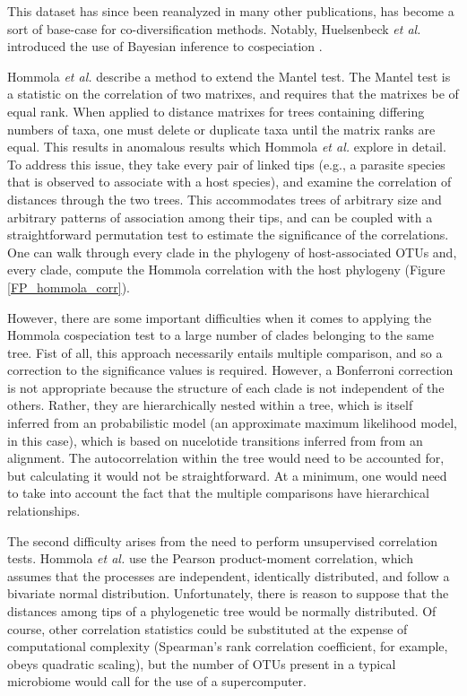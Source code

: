 This dataset has since been reanalyzed in many other publications, has become a sort of base-case for co-diversification methods. Notably, Huelsenbeck {\em et al.} introduced the use of Bayesian inference to cospeciation \cite{huelsenbeck2000bayesian}.

Hommola {\em et al.} \cite{hommola2009permutation} describe a method to extend the Mantel test. \cite{mantel1967detection} The Mantel test is a statistic on the correlation of two matrixes, and requires that the matrixes be of equal rank. When applied to distance matrixes for trees containing differing numbers of taxa, one must delete or duplicate taxa until the matrix ranks are equal. This results in anomalous results which Hommola {\em et al.} explore in detail. To address this issue, they take every pair of linked tips (e.g., a parasite species that is observed to associate with a host species), and examine the correlation of distances through the two trees. This accommodates trees of arbitrary size and arbitrary patterns of association among their tips, and can be coupled with a straightforward permutation test to estimate the significance of the correlations. One can walk through every clade in the phylogeny of host-associated OTUs and, every clade, compute the Hommola correlation with the host phylogeny (Figure \ref{FP_hommola_corr}). 



However, there are some important difficulties when it comes to applying the Hommola cospeciation test to a large number of clades belonging to the same tree. Fist of all, this approach necessarily entails multiple comparison, and so a correction to the significance values is required. However, a Bonferroni correction is not appropriate because the structure of each clade is not independent of the others. Rather, they are hierarchically nested within a tree, which is itself inferred from an probabilistic model (an approximate maximum likelihood model, in this case), which is based on nucelotide transitions inferred from from an alignment. The autocorrelation within the tree would need to be accounted for, but calculating it would not be straightforward. At a minimum, one would need to take into account the fact that the multiple comparisons have hierarchical relationships.

The second difficulty arises from the need to perform unsupervised correlation tests. Hommola {\em et al.} use the Pearson product-moment correlation, which assumes that the processes are independent, identically distributed, and follow a bivariate normal distribution. Unfortunately, there is reason to suppose that the distances among tips of a phylogenetic tree would be normally distributed. Of course, other correlation statistics could be substituted at the expense of computational complexity (Spearman's rank correlation coefficient, for example, obeys quadratic scaling), but the number of OTUs present in a typical microbiome would call for the use of a supercomputer.

